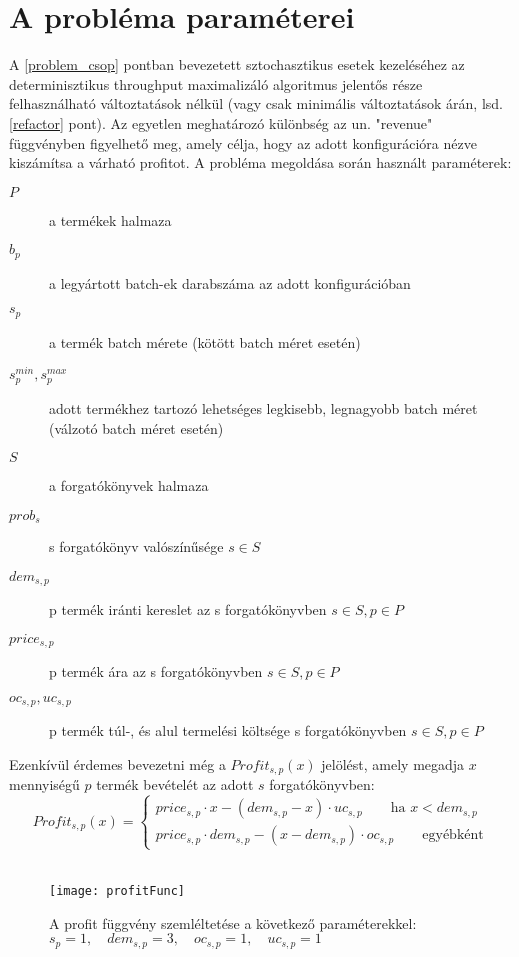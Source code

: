 \section{A probléma paraméterei} \label{problem_parameters}
A \ref{problem_csop} pontban bevezetett sztochasztikus esetek kezeléséhez az determinisztikus throughput maximalizáló algoritmus jelentős része felhasználható változtatások nélkül (vagy csak minimális változtatások árán, lsd. \ref{refactor} pont).
Az egyetlen meghatározó különbség az un. "revenue" függvényben figyelhető meg, amely célja, hogy az adott konfigurációra nézve kiszámítsa a várható profitot.
A probléma megoldása során használt paraméterek:
\begin {description}
\item[$P$]  a termékek halmaza
\item[$b_p$]  a legyártott batch-ek darabszáma az adott konfigurációban
\item[$s_p$]  a termék batch mérete (kötött batch méret esetén)
\item[$s_p^{min},s_p^{max}$]  adott termékhez tartozó lehetséges legkisebb, legnagyobb batch méret (válzotó batch méret esetén)
\item[$S$]  a forgatókönyvek halmaza
\item[$prob_s$]  s forgatókönyv valószínűsége $s	\in S$
\item[$dem_{s,p}$]  p termék iránti kereslet az s forgatókönyvben $s	\in S, p	\in P$
\item[$price_{s,p}$]  p termék ára az s forgatókönyvben $s	\in S, p	\in P$
\item[$oc_{s,p}, uc_{s,p}$]  p termék túl-, és alul termelési költsége s forgatókönyvben $s	\in S, p	\in P$
\end {description}
Ezenkívül érdemes bevezetni még a $Profit_{s,p}(x)$ jelölést, amely megadja $x$ mennyiségű $p$ termék bevételét az adott $s$ forgatókönyvben:
\begin{equation*}
Profit_{s,p}(x)= \begin{cases}
            price_{s,p}\cdot x-(dem_{s,p}-x) \cdot uc_{s,p}\qquad \text{ha } x<dem_{s,p} \\
            price_{s,p} \cdot dem_{s,p}-(x-dem_{s,p}) \cdot oc_{s,p}\qquad \text{egyébként}
       \end{cases}
\end{equation*}\\
\begin{figure}
\begin{center}
\texttt{[image: profitFunc]}
\caption[A profit függvény szemléltetése a következő paraméterekkel:; $s_p=1,\quad dem_{s,p}=3, \quad oc_{s,p}=1, \quad  uc_{s,p}=1$]
    {A profit függvény szemléltetése a következő paraméterekkel: \\ $s_p=1,\quad dem_{s,p}=3, \quad oc_{s,p}=1, \quad  uc_{s,p}=1$\endtabular}
\label{profit_func}
\end{center}
\end{figure}
